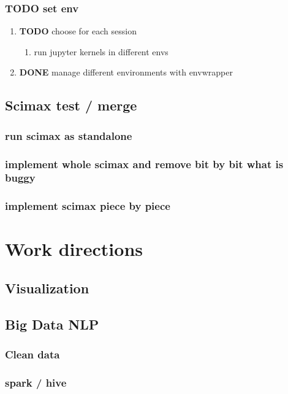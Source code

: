 \documentclass[11pt]{article}
\begin{document}
\subsubsection{{\bfseries\sffamily TODO} set env}
\label{sec:orgdfc44d9}
\begin{enumerate}
\item {\bfseries\sffamily TODO} choose for each session
\label{sec:org8e2ce6e}
\begin{enumerate}
\item run jupyter kernels in different envs
\label{sec:org4a7f291}
\end{enumerate}
\item {\bfseries\sffamily DONE} manage different environments with envwrapper
\label{sec:orga67f531}
\end{enumerate}
\subsection{Scimax test / merge}
\label{sec:orga104b16}
\subsubsection{run scimax as standalone}
\label{sec:orgae49ae2}
\subsubsection{implement whole scimax and remove bit by bit what is buggy}
\label{sec:org514ee7f}
\subsubsection{implement scimax piece by piece}
\label{sec:orga026030}
\section{Work directions}
\label{sec:orgf8e40df}
\subsection{Visualization}
\label{sec:org9a520ee}
\subsection{Big Data NLP}
\label{sec:org69bdf29}
\subsubsection{Clean data}
\label{sec:org5ec9119}
\subsubsection{spark / hive}
\label{sec:orgb30f03d}
\end{document}
